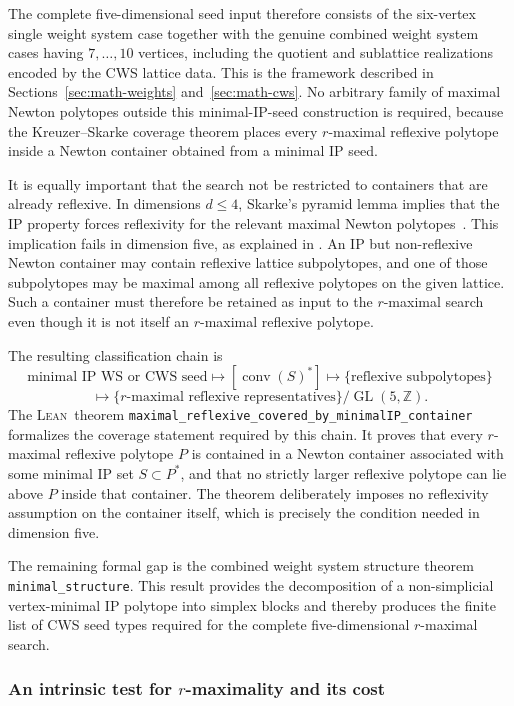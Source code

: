 \documentclass[appliedmath,article,submit,moreauthors]{Definitions/mdpi}
\newcommand{\Z}{\mathbb{Z}}
\newcommand{\GL}{\operatorname{GL}}
\newcommand{\Lean}{\textsc{Lean}}
\newcommand{\Conv}{\operatorname{conv}}
\begin{document}
The complete five-dimensional seed input therefore consists of the six-vertex
single weight system case together with the genuine combined weight system cases
having \(7,\ldots,10\) vertices, including the quotient and sublattice
realizations encoded by the CWS lattice data. This is the framework described in
Sections~\ref{sec:math-weights} and~\ref{sec:math-cws}. No arbitrary family of maximal Newton
polytopes outside this minimal-IP-seed construction is required, because the
Kreuzer--Skarke coverage theorem places every \(r\)-maximal reflexive polytope
inside a Newton container obtained from a minimal IP seed.

It is equally important that the search not be restricted to containers that are
already reflexive. In dimensions \(d\leq4\), Skarke's pyramid lemma implies that
the IP property forces reflexivity for the relevant maximal Newton
polytopes~\cite{Skarke1996}. This implication fails in dimension five, as
explained in . An IP but non-reflexive Newton container
may contain reflexive lattice subpolytopes, and one of those subpolytopes may be
maximal among all reflexive polytopes on the given lattice. Such a container
must therefore be retained as input to the \(r\)-maximal search even though it
is not itself an \(r\)-maximal reflexive polytope.

The resulting classification chain is
\[
\text{minimal IP WS or CWS seed}
\longmapsto
[\Conv(S)^*]
\longmapsto
\{\text{reflexive subpolytopes}\}\]
\[
\longmapsto
\{\text{\(r\)-maximal reflexive representatives}\}/\GL(5,\Z).
\]
The \Lean\ theorem \nolinkurl{maximal_reflexive_covered_by_minimalIP_container}
formalizes the coverage statement required by this chain. It proves that every
\(r\)-maximal reflexive polytope \(P\) is contained in a Newton container
associated with some minimal IP set \(S\subset P^*\), and that no strictly
larger reflexive polytope can lie above \(P\) inside that container. The theorem
deliberately imposes no reflexivity assumption on the container itself, which is
precisely the condition needed in dimension five.

The remaining formal gap is the combined weight system structure theorem
\nolinkurl{minimal_structure}. This result provides the decomposition of a
non-simplicial vertex-minimal IP polytope into simplex blocks and thereby
produces the finite list of CWS seed types required for the complete
five-dimensional \(r\)-maximal search.

\subsubsection{An intrinsic test for \texorpdfstring{\(r\)}{r}-maximality and its cost}
\label{sec:rmax-cost}
\end{document}
